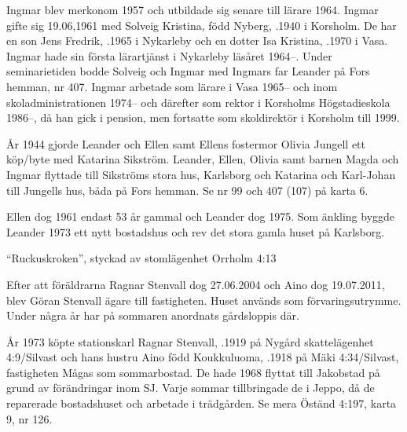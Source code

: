 Ingmar blev merkonom 1957 och utbildade sig senare till lärare 1964. Ingmar gifte sig 19.06,1961 med Solveig Kristina, född Nyberg, .1940 i Korsholm. De har en son Jens Fredrik, .1965 i Nykarleby och en dotter Isa Kristina, .1970 i Vasa. Ingmar hade sin första lärartjänst i Nykarleby läsåret 1964--. Under seminarietiden bodde Solveig och Ingmar med Ingmars far Leander på Fors hemman, nr 407. Ingmar arbetade som lärare i Vasa 1965-- och inom skoladministrationen 1974-- och därefter som rektor i Korsholms Högstadieskola 1986--, då han gick i pension, men fortsatte som skoldirektör i Korsholm till 1999.

År 1944 gjorde Leander och Ellen samt Ellens fostermor Olivia Jungell ett köp/byte med Katarina Sikström. Leander, Ellen, Olivia samt barnen Magda och Ingmar flyttade till Sikströms stora hus, Karlsborg och Katarina och Karl-Johan till Jungells hus, båda på Fors hemman. Se nr 99 och 407 (107) på karta 6.

Ellen dog 1961 endast 53 år gammal och Leander dog 1975. Som änkling byggde Leander 1973 ett nytt bostadshus och rev det stora gamla huset på Karlsborg.



%

``Ruckuskroken'', styckad av stomlägenhet Orrholm 4:13

%
Efter att föräldrarna Ragnar Stenvall dog 27.06.2004 och Aino	dog 19.07.2011, blev Göran Stenvall ägare till fastigheten. Huset används som förvaringsutrymme. Under några år har på sommaren anordnats gårdsloppis där.



%
År 1973 köpte stationskarl Ragnar Stenvall, .1919 på Nygård skattelägenhet 4:9/Silvast och hans hustru Aino född	Koukkuluoma, .1918 på Mäki 4:34/Silvast, fastigheten Mågas som sommarbostad. De hade 1968 flyttat till Jakobstad på grund av förändringar inom SJ. Varje sommar tillbringade de i Jeppo, då de reparerade bostadshuset och arbetade i trädgården. Se mera Öständ 4:197, karta 9, nr 126.


